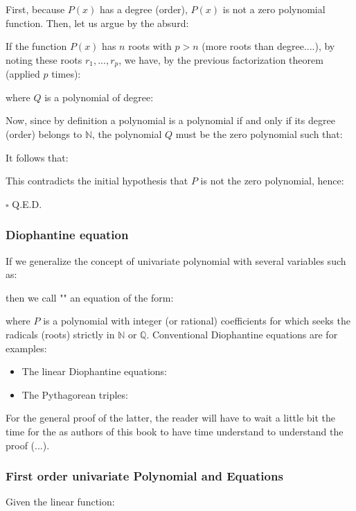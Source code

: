 	\begin{dem}
	First, because $P(x)$ has a degree (order), $P(x)$ is not a zero polynomial function. Then, let us argue by the absurd:
	
	If the function $P(x)$ has $n$ roots with $p>n$ (more roots than degree....), by noting these roots $r_1,...,r_p$, we have, by the previous  factorization theorem (applied $p$ times):
	
	where $Q$ is a polynomial of degree:
	
	Now, since by definition a polynomial is a polynomial if and only if its degree (order) belongs to  $\mathbb{N}$, the polynomial $Q$ must be the zero polynomial such that:
	
	It follows that:
	
	This contradicts the initial hypothesis that $P$ is not the zero polynomial, hence:
	
	\begin{flushright}
		$\square$  Q.E.D.
	\end{flushright}
	\end{dem}
	
	\subsubsection{Diophantine equation}
	If we generalize the concept of univariate polynomial with several variables such as:
	
	then we call "" an equation of the form:
	
	where $P$ is a polynomial with integer (or rational) coefficients for which seeks the radicals (roots) strictly in $\mathbb{N}$ or $\mathbb{Q}$. Conventional Diophantine equations are for examples:
	\begin{itemize}
		\item  The linear Diophantine equations:
		
		
		\item The Pythagorean triples:
			
	\end{itemize}
	For the general proof of the latter, the reader will have to wait a little bit the time for the as authors of this book to have time understand to understand the proof (...).
	
	\subsubsection{First order univariate Polynomial and Equations}
	Given the linear function:
	
